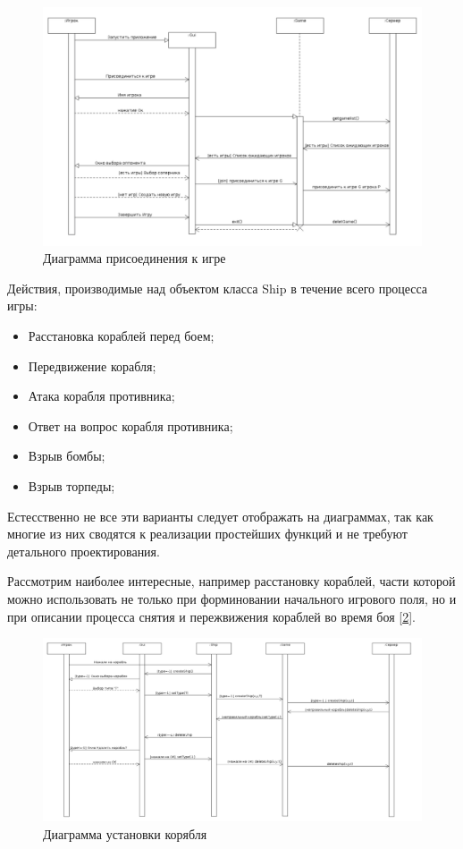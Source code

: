 \begin{figure}[pt]
\centering
\includegraphics[width=18cm]{images/JG.png}
\caption{Диаграмма присоединения к игре}
\label{fig10}
\end{figure}

Действия, производимые над объектом класса Ship в течение всего процесса игры:
	\begin{itemize}
		\item Расстановка кораблей перед боем;
		\item Передвижение корабля;
		\item Атака корабля противника;
		\item Ответ на вопрос корабля противника;
		\item Взрыв бомбы;
		\item Взрыв торпеды;
  	\end{itemize} 
Естесственно не все эти варианты следует отображать на диаграммах, так как многие из них сводятся к реализации простейших функций и не требуют детального проектирования. 

Рассмотрим наиболее интересные, например расстановку кораблей, части которой можно использовать не только при форминовании начального игрового поля, но и при описании процесса снятия и пережвижения кораблей во время боя [\ref{fig11}].

\begin{figure}[pt]
\centering
\includegraphics[width=18cm]{images/CRS.png}
\caption{Диаграмма установки корябля}
\label{fig11}
\end{figure}

